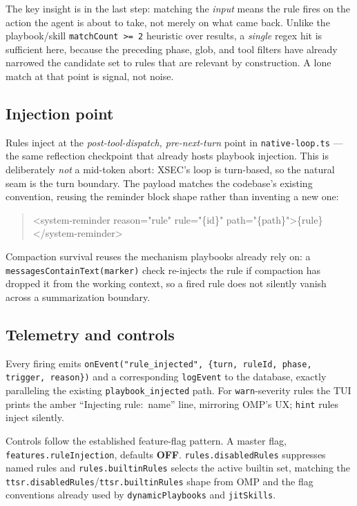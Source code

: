 \documentclass[11pt]{article}
\begin{document}
The key insight is in the last step: matching the \emph{input} means the rule
fires on the action the agent is about to take, not merely on what came back.
Unlike the playbook/skill \texttt{matchCount >= 2} heuristic over results, a
\emph{single} regex hit is sufficient here, because the preceding phase, glob, and
tool filters have already narrowed the candidate set to rules that are relevant
by construction. A lone match at that point is signal, not noise.

\subsection{Injection point}

Rules inject at the \emph{post-tool-dispatch, pre-next-turn} point in
\texttt{native-loop.ts} --- the same reflection checkpoint that already hosts
playbook injection. This is deliberately \emph{not} a mid-token abort: XSEC's
loop is turn-based, so the natural seam is the turn boundary. The payload matches
the codebase's existing convention, reusing the reminder block shape rather than
inventing a new one:

\begin{quote}\ttfamily
<system-reminder reason="rule" rule="\{id\}" path="\{path\}">\{rule\}</system-reminder>
\end{quote}

Compaction survival reuses the mechanism playbooks already rely on: a
\texttt{messagesContainText(marker)} check re-injects the rule if compaction has
dropped it from the working context, so a fired rule does not silently vanish
across a summarization boundary.

\subsection{Telemetry and controls}

Every firing emits \texttt{onEvent("rule\_injected", \{turn, ruleId, phase,
trigger, reason\})} and a corresponding \texttt{logEvent} to the database,
exactly paralleling the existing \texttt{playbook\_injected} path. For
\texttt{warn}-severity rules the TUI prints the amber ``Injecting rule:
\guillemotright{}\,name'' line, mirroring OMP's UX; \texttt{hint} rules inject
silently.

Controls follow the established feature-flag pattern. A master flag,
\texttt{features.ruleInjection}, defaults \textbf{OFF}. \texttt{rules.disabledRules}
suppresses named rules and \texttt{rules.builtinRules} selects the active builtin
set, matching the \texttt{ttsr.disabledRules}/\texttt{ttsr.builtinRules} shape from
OMP and the flag conventions already used by \texttt{dynamicPlaybooks} and
\texttt{jitSkills}.
\end{document}
